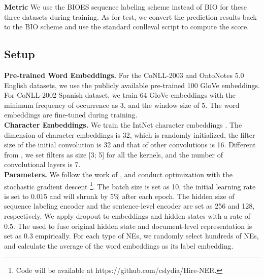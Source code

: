 \documentclass[letterpaper]{article} \usepackage{aaai20}  \usepackage{times}  \usepackage{helvet} \usepackage{courier}  \usepackage[hyphens]{url}  \usepackage{graphicx} \urlstyle{rm} \def\UrlFont{\rm}  \usepackage{graphicx}  \frenchspacing  \setlength{\pdfpagewidth}{8.5in}  \setlength{\pdfpageheight}{11in}
\begin{document}
\noindent\textbf{Metric}  We use the BIOES sequence labeling
scheme instead of BIO for these three datasets during training. As for test, we convert the prediction results back to the
BIO scheme and use the standard conlleval script to compute the  score.

\subsection{Setup} 
\textbf{Pre-trained Word Embeddings.} For the CoNLL-2003 and OntoNotes 5.0 English datasets, we use the publicly available pre-trained 100 GloVe \cite{pennington2014glove} embeddings. For CoNLL-2002 Spanish dataset, we train 64 GloVe embeddings with the minimum frequency of occurrence as 3, and the window size of 5. The word embeddings are fine-tuned during training.\\
\textbf{Character Embeddings.} We train the IntNet character embeddings \cite{xin2018learning}. The dimension of character embeddings is 32, which is randomly initialized, the filter size of the initial convolution is 32 and that of other convolutions is 16. Different from \cite{xin2018learning}, we set filters as size [3; 5] for all the kernels, and the number of convolutional layers is 7.
\\
\textbf{Parameters.}  We follow the work of \cite{yang2018ncrf}, and conduct optimization with the stochastic gradient descent \footnote{Code will be available at https://github.com/cslydia/Hire-NER.}. The batch size is set as 10, the initial learning rate is set to 0.015 and will shrunk by 5\% after each epoch. The hidden size of sequence labeling encoder and the sentence-level encoder are set as 256 and 128, respectively. We apply dropout 
to embeddings and hidden states with a rate of 0.5. The  used to fuse original hidden state and document-level representation is set as 0.3 empirically. 
For each type of NEs, we randomly select hundreds of NEs, and calculate the average of the word embeddings as its label embedding. 

\begin{table}[t!] 
\centering
{}
\caption{ scores on CoNLL-2002.}
\label{02result}
\end{table} 
\end{document}
